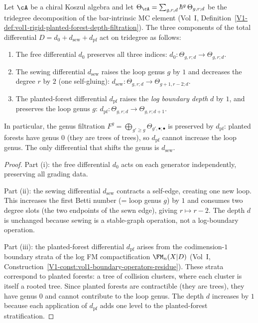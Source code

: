 \begin{lemma}
Let $\cA$ be a chiral Koszul algebra and let
$\Theta_\cA = \sum_{g,r,d}\hbar^g\,\Theta_{g,r;d}$
be the tridegree decomposition of the bar-intrinsic MC element
\textup{(}Vol~I, Definition~\textup{\ref*{V1-def:vol1-rigid-planted-forest-depth-filtration}}\textup{)}.
The three components of the total differential $D = d_0 + d_{\mathrm{sew}} + d_{\mathrm{pf}}$ act on tridegree as follows:
\begin{enumerate}[label=\textup{(\roman*)},leftmargin=1.8em]
\item The free differential $d_0$ preserves all three indices:
$d_0\colon\Theta_{g,r;d}\to\Theta_{g,r;d}$.
\item The sewing differential $d_{\mathrm{sew}}$ raises the loop
genus $g$ by $1$ and decreases the degree $r$ by $2$ (one
self-gluing):
$d_{\mathrm{sew}}\colon\Theta_{g,r;d}\to\Theta_{g+1,r-2;d}$.
\item The planted-forest differential $d_{\mathrm{pf}}$ raises
the \emph{log boundary depth} $d$ by $1$, and preserves
the loop genus $g$:
$d_{\mathrm{pf}}\colon\Theta_{g,r;d}\to\Theta_{g,r;d+1}$.
\end{enumerate}
In particular, the genus filtration
$F^g = \bigoplus_{g'\ge g}\Theta_{g',\bullet;\bullet}$ is
preserved by $d_{\mathrm{pf}}$: planted forests have genus $0$
\textup{(}they are trees of trees\textup{)}, so
$d_{\mathrm{pf}}$ cannot increase the loop genus. The only
differential that shifts the genus is $d_{\mathrm{sew}}$.
\end{lemma}

\begin{proof}
Part (i): the free differential $d_0$ acts on each generator
independently, preserving all grading data.

Part (ii): the sewing differential $d_{\mathrm{sew}}$
contracts a self-edge, creating one new loop. This increases
the first Betti number (= loop genus $g$) by $1$ and consumes
two degree slots (the two endpoints of the sewn edge), giving
$r\mapsto r-2$. The depth $d$ is unchanged because sewing
is a stable-graph operation, not a log-boundary operation.

Part (iii): the planted-forest differential $d_{\mathrm{pf}}$
arises from the codimension-$1$ boundary strata of the log FM
compactification $\FM_n(X|D)$ (Vol~I,
Construction~\ref*{V1-const:vol1-boundary-operators-residue}).
These strata correspond to planted forests: a tree of collision
clusters, where each cluster is itself a rooted tree. Since
planted forests are contractible (they are trees), they have
genus $0$ and cannot contribute to the loop genus. The depth
$d$ increases by $1$ because each application of $d_{\mathrm{pf}}$
adds one level to the planted-forest stratification.
\end{proof}

